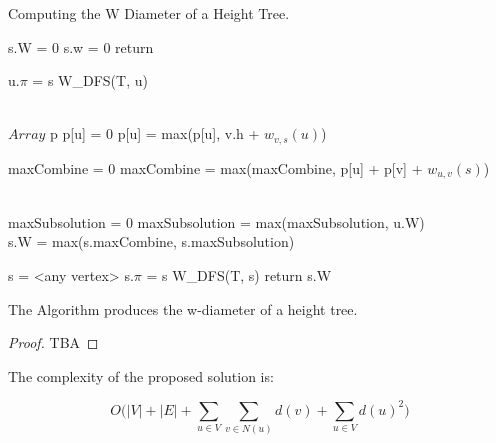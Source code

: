 \begin{algorithm}
\caption{Computing the W Diameter of a Height Tree.}

\begin{algorithmic}[1]


        \State s.W = 0
        \State s.w = 0
        \State return
    \EndIf

            \State u.$\pi$ = s
            \State W\_DFS(T, u)
        \EndIf
    \EndFor

    \\
    \State $Array$ p
        \State p[u] = 0
            \State p[u] = max(p[u], v.h + $w_{v, s}(u)$) 
        \EndFor
    \EndFor

    \State maxCombine = 0
        \State maxCombine = max(maxCombine, p[u] + p[v] + $w_{u, v}(s)$)
        \EndFor
    \EndFor

    \\
    \State maxSubsolution = 0
        \State maxSubsolution = max(maxSubsolution, u.W)
    \EndFor
    \\
    \State s.W = max(s.maxCombine, s.maxSubsolution)

\EndFunction

    \State s = <any vertex>
    \State s.$\pi$ = s
    \State W\_DFS(T, s)
    \State return s.W
\EndFunction

\end{algorithmic}
\end{algorithm}

\begin{lem} The Algorithm produces the w-diameter of a height tree. \end{lem}


\begin{proof}
    TBA
\end{proof}


The complexity of the proposed solution is:

$$ O\bigg( |V| + |E| + \sum_{u \in V}{\sum_{v \in N(u)}{d(v)}} + \sum_{u \in V}{d(u)^2}  \bigg) $$

